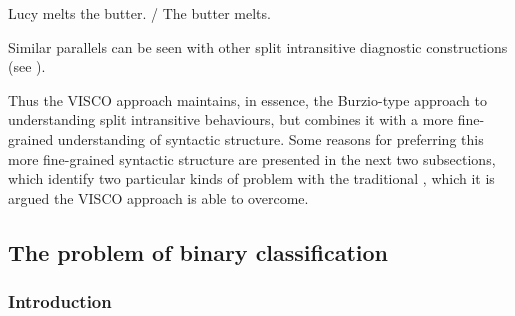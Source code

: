 \documentclass[output=paper]{langsci/langscibook}
\begin{document}
\ea Lucy melts the butter. / The butter melts.\\
\z
Similar parallels can be seen with other split intransitive diagnostic
constructions (see \citealt{Baker2018,Baker2019}).

Thus the VISCO approach maintains, in essence, the Burzio-type approach to
understanding split intransitive behaviours, but combines it with a more
fine-grained understanding of syntactic structure. Some reasons for preferring
this more fine-grained syntactic structure are presented in the next two
subsections, which identify two particular kinds of problem with the
traditional , which it is argued the VISCO approach is
able to overcome.

\subsection{The problem of binary classification}

\subsubsection{Introduction}
\end{document}
